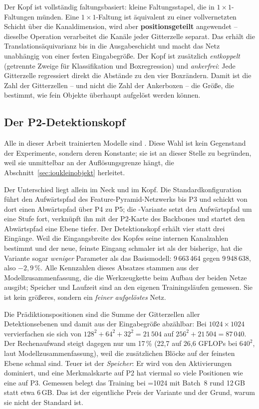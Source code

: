  Der Kopf ist vollständig faltungsbasiert: kleine
Faltungsstapel, die in $1\times1$-Faltungen münden. Eine $1\times1$-Faltung ist
äquivalent zu einer vollvernetzten Schicht über die Kanaldimension, wird aber
\textbf{positionsgeteilt} angewendet -- dieselbe Operation verarbeitet die Kanäle
jeder Gitterzelle separat. Das erhält die Translationsäquivarianz bis in die
Ausgabeschicht und macht das Netz unabhängig von einer festen Eingabegröße. Der
Kopf ist zusätzlich
\emph{entkoppelt} (getrennte Zweige für Klassifikation und Boxregression) und
\emph{ankerfrei}: Jede Gitterzelle regressiert direkt die Abstände zu den vier
Boxrändern. Damit ist die Zahl der Gitterzellen -- und nicht die Zahl der
Ankerboxen -- die Größe, die bestimmt, wie fein Objekte überhaupt aufgelöst
werden können.

\subsection{Der P2-Detektionskopf}
\label{sec:p2kopf}

Alle in dieser Arbeit trainierten Modelle sind . Diese Wahl ist
kein Gegenstand der Experimente, sondern deren Konstante; sie ist an dieser
Stelle zu begründen, weil sie unmittelbar an der Auflösungsgrenze hängt, die
Abschnitt~\ref{sec:ioukleinobjekt} herleitet.

\absatz{} Der Unterschied liegt allein im Neck und im Kopf. Die
Standardkonfiguration führt den Aufwärtspfad des Feature-Pyramid-Netzwerks
\parencite{lin2017fpn} bis P3 und schickt von dort einen Abwärtspfad über P4 zu
P5; die -Variante setzt den Aufwärtspfad um eine Stufe fort, verknüpft
ihn mit der P2-Karte des Backbones und startet den Abwärtspfad eine Ebene tiefer.
Der Detektionskopf erhält vier statt drei Eingänge. Weil die Eingangsbreite des
Kopfes seine internen Kanalzahlen bestimmt und der neue, feinste Eingang schmaler
ist als der bisherige, hat die Variante sogar \emph{weniger} Parameter als das
Basismodell: 9\,663\,464 gegen 9\,948\,638, also $-2{,}9\,\%$. Alle Kennzahlen
dieses Absatzes stammen aus der Modellzusammenfassung, die die Werkzeugkette beim
Aufbau der beiden Netze ausgibt; Speicher und Laufzeit sind an den eigenen
Trainingsläufen gemessen. Sie ist kein
größeres, sondern ein \emph{feiner aufgelöstes} Netz.

\absatz{}Die Prädiktionspositionen sind die Summe der
Gitterzellen aller Detektionsebenen und damit aus der Eingabegröße abzählbar: Bei
$1024\times1024$ vervierfachen sie sich von $128^2+64^2+32^2 = 21\,504$ auf
$256^2 + 21\,504 = 87\,040$. Der Rechenaufwand steigt dagegen nur um 17\,\%
(22,7 auf 26,6 GFLOPs bei $640^2$, laut Modellzusammenfassung), weil die zusätzlichen Blöcke
auf der feinsten Ebene schmal sind. Teuer ist der \emph{Speicher}: Er wird von
den Aktivierungen dominiert, und eine Merkmalskarte auf P2 hat viermal so viele
Positionen wie eine auf P3. Gemessen belegt das Training bei =1024
mit Batch~8 rund 12\,GB statt etwa 6\,GB. Das ist der eigentliche Preis der
Variante und der Grund, warum sie nicht der Standard ist.

